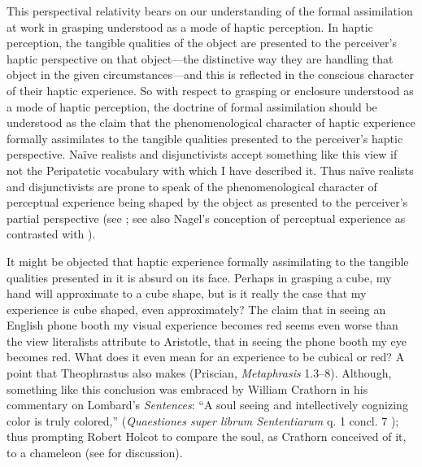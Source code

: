 This perspectival relativity bears on our understanding of the formal assimilation at work in grasping understood as a mode of haptic perception. In haptic perception, the tangible qualities of the object are presented to the perceiver's haptic perspective on that object---the distinctive way they are handling that object in the given circumstances---and this is reflected in the conscious character of their haptic experience. So with respect to grasping or enclosure understood as a mode of haptic perception, the doctrine of formal assimilation should be understood as the claim that the phenomenological character of haptic experience formally assimilates to the tangible qualities presented to the perceiver's haptic perspective. Na\"{i}ve realists and disjunctivists accept something like this view if not the Peripatetic vocabulary with which I have described it. Thus na\"{i}ve realists and disjunctivists are prone to speak of the phenomenological character of perceptual experience being shaped by the object as presented to the perceiver's partial perspective (see \citealt{McDowell:1998vn,Martin:2004fj,Fish:2009fk,Kalderon:2011fk}; see also Nagel's \citeyear{Nagel:1979fk} conception of perceptual experience as contrasted with \citealt{Jackson:1982my}).

It might be objected that haptic experience formally assimilating to the tangible qualities presented in it is absurd on its face. Perhaps in grasping a cube, my hand will approximate to a cube shape, but is it really the case that my experience is cube shaped, even approximately? The claim that in seeing an English phone booth my visual experience becomes red seems even worse than the view literalists attribute to Aristotle, that in seeing the phone booth my eye becomes red. What does it even mean for an experience to be cubical or red? A point that Theophrastus also makes (Priscian, \emph{Metaphrasis} 1.3–8). Although, something like this conclusion was embraced by William Crathorn in his commentary on Lombard's \emph{Sentences}: ``A soul seeing and intellectively cognizing color is truly colored,'' (\emph{Quaestiones super librum Sententiarum} q. 1 concl. 7 \citealt[288]{Pasnau:2002pb}); thus prompting Robert Holcot to compare the soul, as Crathorn conceived of it, to a chameleon (see \citealt[Chapter 1.1]{Pasnau:1997aa} for discussion). 

